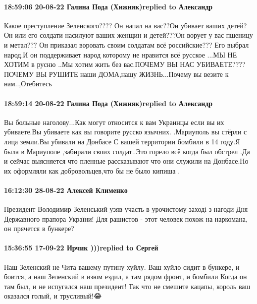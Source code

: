  
 
 
 
 

\paragraph{18:59:06 20-08-22 Галина Пода (Хижняк)replied to Александр}

Какое преступление Зеленского???? Он напал на вас??Он убивает ваших детей? Он
или его солдати насилуют ваших женщин и детей???Он ворует у вас пшеницу и
метал??? Он приказал воровать своим солдатам всё российские??? Его выбрал
народ.И он поддерживает народ которому не нравится всё русское ...МЫ НЕ ХОТИМ в
русню ..Мы хотим жить без вас.ПОЧЕМУ ВЫ НАС УБИВАЕТЕ????ПОЧЕМУ ВЫ РУШИТЕ наши
ДОМА,нашу ЖИЗНЬ...Почему вы везите к нам..,Отебитесь

\paragraph{18:59:14 20-08-22 Галина Пода (Хижняк)replied to Александр}

Вы больные наголову...Как могут относится к вам Украинцы если вы их убиваете.Вы
убиваете как вы говорите русско язычних. .Мариуполь вы стёрли с лица земли.Вы
убивали на Донбасе С вашей территории бомбили в 14 году.Я была в Мариуполе
,забирали своих солдат..Это горело всё когда был обстрел .Да и сейчас
выясняется что пленные рассказывают что они служили на Донбасе.Но их оформляли
как добровольцев,что бы не было кипиша .

\paragraph{16:12:30 28-08-22 Алексей Клименко}

Президент Володимир Зеленський узяв участь в урочистому заході з нагоди Дня
Державного прапора України! Для рашистов - этот человек похож на наркомана, он
прячется в бункере?


\paragraph{15:36:55 17-09-22 Ирчик )))replied to Сергей}

Наш Зеленский не Чита вашему путину хуйлу. Ваш хуйло сидит в бункере, и боится,
а наш Зеленский в изюм ездил, а там рядом фронт, и бомбили Когда он там был, и
не испугался наш президент! Так что не смешите кацапы, король ваш оказался
голый, и трусливый!😂🤣🤣🤣🤣

